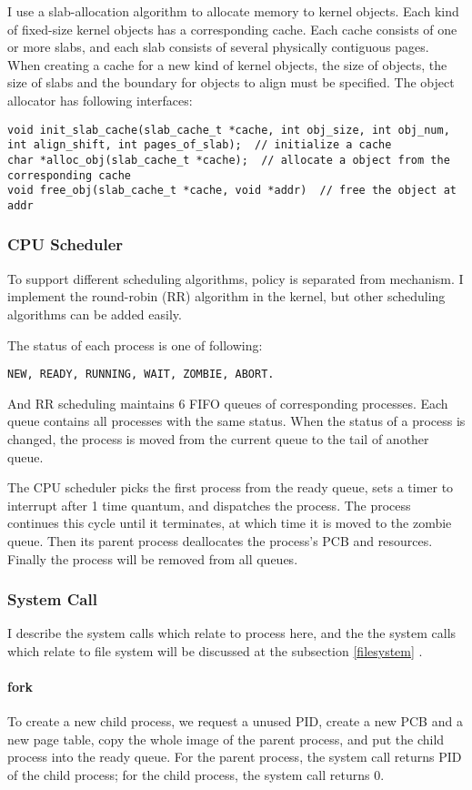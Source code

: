 \documentclass[12pt, a4paper]{article}
\begin{document}
I use a slab-allocation algorithm to allocate memory to kernel objects. Each kind of fixed-size kernel objects has a corresponding cache. Each cache consists of one or more slabs, and each slab consists of several physically contiguous pages. When creating a cache for a new kind of kernel objects, the size of objects, the size of slabs and the boundary for objects to align must be specified. The object allocator has following interfaces:
\begin{lstlisting}
void init_slab_cache(slab_cache_t *cache, int obj_size, int obj_num, int align_shift, int pages_of_slab);  // initialize a cache
char *alloc_obj(slab_cache_t *cache);  // allocate a object from the corresponding cache
void free_obj(slab_cache_t *cache, void *addr)  // free the object at addr
\end{lstlisting}

\subsubsection{CPU Scheduler}
To support different scheduling algorithms, policy is separated from mechanism. I implement the round-robin (RR) algorithm in the kernel, but other scheduling algorithms can be added easily.

The status of each process is one of following:
\begin{verbatim}
NEW, READY, RUNNING, WAIT, ZOMBIE, ABORT.
\end{verbatim}
And RR scheduling maintains 6 FIFO queues of corresponding processes. Each queue contains all processes with the same status. When the status of a process is changed, the process is moved from the current queue to the tail of another queue.

The CPU scheduler picks the first process from the ready queue, sets a timer to interrupt after 1 time quantum, and dispatches the process. The process continues this cycle until it terminates, at which time it is moved to the zombie queue. Then its parent process deallocates the process's PCB and resources. Finally the process will be removed from all queues.

\subsubsection{System Call}
I describe the system calls which relate to process here, and the the system calls which relate to file system will be discussed at the subsection \ref{filesystem} .

\paragraph{fork}
To create a new child process, we request a unused PID, create a new PCB and a new page table, copy the whole image of the parent process, and put the child process into the ready queue. For the parent process, the system call returns PID of the child process; for the child process, the system call returns 0.
\end{document}
